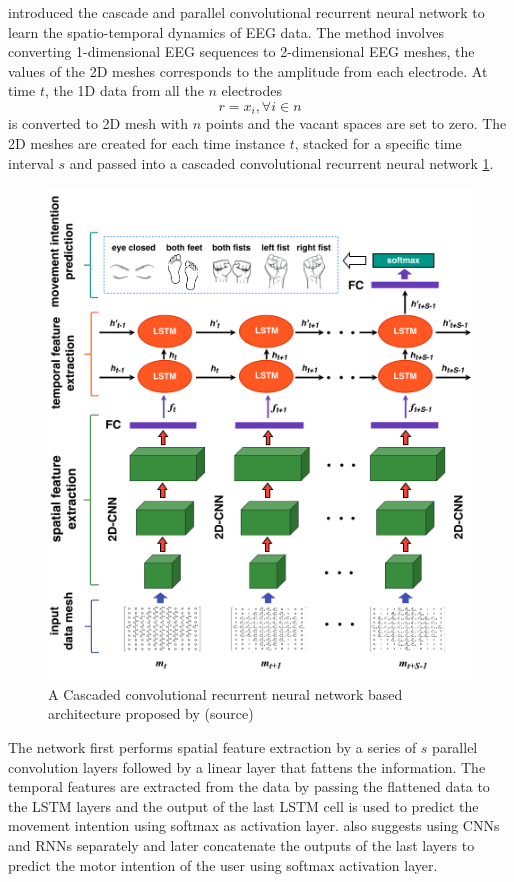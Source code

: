 \cite{2021_DL_LSTM_MI} introduced the cascade and parallel convolutional recurrent neural network to learn the spatio-temporal dynamics of EEG data. The method involves converting 1-dimensional EEG sequences to 2-dimensional EEG meshes, the values of the 2D meshes corresponds to the amplitude from each electrode. At time $t$, the 1D data from all the $n$ electrodes $$r = x_i,  \forall i \in n$$ is converted to 2D mesh with $n$ points and the vacant spaces are set to zero. The 2D meshes are created for each time instance $t$, stacked for a specific time interval $s$ and passed into a cascaded convolutional recurrent neural network \ref{fig:2021_DL_LSTM_MI_CCRNN}. 
    \begin{figure}[H] 
    \begin{center}
        \includegraphics[height=1.0\textwidth]{images/2021_DL_LSTM_MI_CCRNN.png}
        \caption{A Cascaded convolutional recurrent neural network based architecture proposed by \cite{2021_DL_LSTM_MI}(source)}
        \label{fig:2021_DL_LSTM_MI_CCRNN}        
    \end{center}
    \end{figure}

The network first performs spatial feature extraction by a series of $s$ parallel convolution layers followed by a linear layer that fattens the information. The temporal features are extracted from the data by passing the flattened data to the LSTM layers and the output of the last LSTM cell is used to predict the movement intention using softmax as activation layer. \cite{2021_DL_LSTM_MI} also suggests using CNNs and RNNs separately and later concatenate the outputs of the last layers to predict the motor intention of the user using softmax activation layer.

